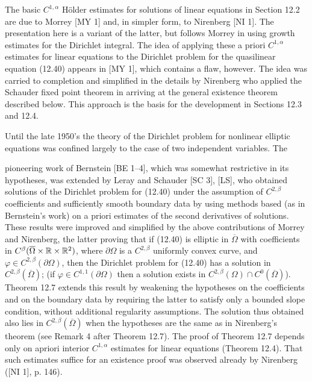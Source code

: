 The basic $C^{1,\alpha}$ Hölder estimates for solutions of linear equations in
Section 12.2 are due to Morrey [MY 1] and, in simpler form, to Nirenberg
[NI 1]. The presentation here is a variant of the latter, but follows Morrey in
using growth estimates for the Dirichlet integral. The idea of applying these
a priori $C^{1,\alpha}$ estimates for linear equations to the Dirichlet problem
for the quasilinear equation (12.40) appears in [MY 1], which contains a flaw,
however. The idea was carried to completion and simplified in the details by
Nirenberg who applied the Schauder fixed point theorem in arriving at the
general existence theorem described below. This approach is the basis for the
development in Sections 12.3 and 12.4.

Until the late 1950's the theory of the Dirichlet problem for nonlinear elliptic
equations was confined largely to the case of two independent variables. The





\noindent pioneering work of Bernstein [BE 1--4], which was somewhat restrictive in its hypotheses, was extended by Leray and Schauder [SC 3], [LS], who obtained solutions of the Dirichlet problem for (12.40) under the assumption of $C^{2,\beta}$ coefficients and sufficiently smooth boundary data by using methods based (as in Bernstein's work) on a priori estimates of the second derivatives of solutions. These results were improved and simplified by the above contributions of Morrey and Nirenberg, the latter proving that if (12.40) is elliptic in $\overline{\Omega}$ with coefficients in $C^{\beta}(\overline{\Omega}\times \mathbb{R} \times \mathbb{R}^{2})$, where $\partial\Omega$ is a $C^{2,\beta}$ uniformly convex curve, and $\varphi\in C^{2,\beta}(\partial\Omega)$, then the Dirichlet problem for (12.40) has a solution in $C^{2,\beta}(\overline{\Omega})$; (if $\varphi\in C^{1,1}(\partial\Omega)$ then a solution exists in $C^{2,\beta}(\Omega)\cap C^{0}(\overline{\Omega})$). Theorem 12.7 extends this result by weakening the hypotheses on the coefficients and on the boundary data by requiring the latter to satisfy only a bounded slope condition, without additional regularity assumptions. The solution thus obtained also lies in $C^{2,\beta}(\overline{\Omega})$ when the hypotheses are the same as in Nirenberg's theorem (see Remark 4 after Theorem 12.7). The proof of Theorem 12.7 depends only on apriori interior $C^{1,\alpha}$ estimates for linear equations (Theorem 12.4). That such estimates suffice for an existence proof was observed already by Nirenberg ([NI 1], p. 146).

